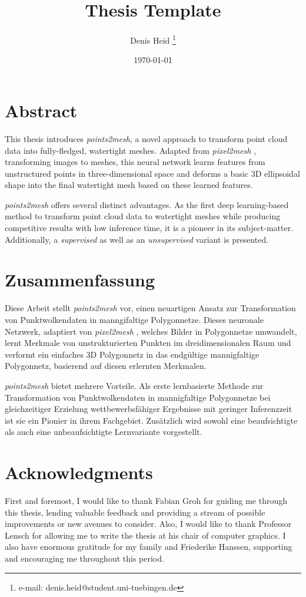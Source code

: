 \documentclass[a4paper,cleardoubleempty,BCOR1cm]{scrbook}
\title{Thesis Template}
\author{Denis Heid \thanks{e-mail: denis.heid@student.uni-tuebingen.de}}
\date{\today}
\begin{document}


\chapter*{Abstract}
    This thesis introduces \emph{points2mesh}, a novel approach to transform point cloud data into fully-fledged, watertight meshes. 
    Adapted from \emph{pixel2mesh} \cite{wang2018pixel2mesh}, transforming images to meshes, this neural network learns features from unstructured points
    in three-dimensional space and deforms a basic 3D ellipsoidal shape into the final watertight mesh based on these learned features.

    \emph{points2mesh} offers several distinct advantages. As the first deep learning-based method to transform point
    cloud data to watertight meshes while producing competitive results with low inference time, it is a pioneer in its subject-matter.
    Additionally, a \emph{supervised} as well as an \emph{unsupervised} variant is presented.


\chapter*{Zusammenfassung}
    Diese Arbeit stellt \emph{points2mesh} vor, einen neuartigen Ansatz zur Transformation von Punktwolkendaten in manngifaltige Polygonnetze. 
    Dieses neuronale Netzwerk, adaptiert von \emph{pixel2mesh} \cite{wang2018pixel2mesh}, welches Bilder in Polygonnetze umwandelt, lernt Merkmale von unstrukturierten Punkten 
    im dreidimensionalen Raum und verformt ein einfaches 3D Polygonnetz in das endgültige mannigfaltige Polygonnetz, basierend auf diesen erlernten Merkmalen.

    \emph{points2mesh} bietet mehrere Vorteile. Als erste lernbasierte Methode zur Transformation von Punktwolkendaten in mannigfaltige Polygonnetze
    bei gleichzeitiger Erzielung wettbewerbsfähiger Ergebnisse mit geringer Inferenzzeit ist sie ein Pionier in ihrem Fachgebiet.
    Zusätzlich wird sowohl eine beaufsichtigte als auch eine unbeaufsichtigte Lernvariante vorgestellt.


\chapter*{Acknowledgments}
    First and foremost, I would like to thank Fabian Groh for guiding me through this thesis, lending valuable feedback and providing 
    a stream of possible improvements or new avenues to consider. Also, I would like to thank Professor Lensch for allowing me to write
     the thesis at his chair of computer graphics.
    I also have enormous gratitude for my family and Friederike Hanssen, supporting and encouraging me throughout this period.
\end{document}
